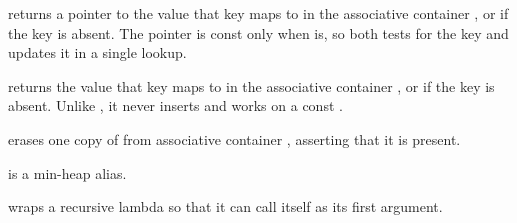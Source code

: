 \begin{compactitem}
  \item {} returns a pointer to the value that key  maps to in the associative container , or  if the key is absent. The pointer is const only when  is, so  both tests for the key and updates it in a single lookup.
  \item {} returns the value that key  maps to in the associative container , or  if the key is absent. Unlike , it never inserts and works on a const .
  \item {} erases one copy of  from associative container , asserting that it is present.
  \item {} is a min-heap alias.
  \item {} wraps a recursive lambda so that it can call itself as its first argument.
\end{compactitem}

